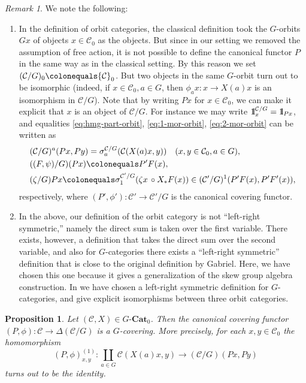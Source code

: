 \documentclass{surv-l}
\numberwithin{equation}{chapter}
\numberwithin{figure}{chapter}
\theoremstyle{plain}
\newtheorem{prp}[thm]{Proposition}
\theoremstyle{definition}
\theoremstyle{remark}
\newtheorem{rmk}[thm]{Remark}
\newcommand{\id}{1\kern-.25em{\text{{\rm l}}}}
\newcommand{\GCat}{G\text{-}\mathbf{Cat}}
\begin{document}
\begin{rmk}
We note the following:
\begin{enumerate}
\item In the definition of orbit categories,
the classical definition took the $G$-orbits $Gx$ of objects $x \in {\mathcal{C}}_0$
as the objects.  But since in our setting we removed the assumption of free action,
it is not possible to define the canonical functor $P$ in the same way as in the classical setting.
By this reason we set $({\mathcal{C}}/G)_0\colonequals  {\mathcal{C}}_0$.
But two objects in the same $G$-orbit turn out to be isomorphic
(indeed, if $x \in {\mathcal{C}}_0, a \in G$, then
$\phi_ax\colon x \to X(a)x$ is an isomorphism in ${\mathcal{C}}/G$).
Note that by writing $Px$ for $x \in {\mathcal{C}}_0$,
we can make it explicit that $x$ is an object of ${\mathcal{C}}/G$.
For instance we may write $\id_x^{{\mathcal{C}}/G} = \id_{Px}$, and
equalities \eqref{eq:hmg-part-orbit}, \eqref{eq:1-mor-orbit}, \eqref{eq:2-mor-orbit}
can be written as
\begin{align}\label{eq:hmg-part-orbit2}
&({\mathcal{C}}/G)^a(Px,Py)=\sigma^{{\mathcal{C}}/G}_a({\mathcal{C}}(X(a) x, y))\quad (x,y\in {\mathcal{C}}_0, a \in G),\\
\label{eq:1-mor-orbit2}
&((F, \psi)/G)(Px)\colonequals P'F(x),\\
\label{eq:2-mor-orbit2}
&(\zeta/G)Px \colonequals  \sigma^{{\mathcal{C}}'/G}_1(\zeta x\, \circ X_*F(x))
\in ({\mathcal{C}}'/G)^1(P'F(x), P'F'(x)),
\end{align}
respectively, where $(P', \phi') \colon {\mathcal{C}}' \to {\mathcal{C}}'/G$ is the canonical covering functor.
\item In the above, our definition of the orbit category is not ``left-right symmetric,''
namely the direct sum is taken over the first variable.
There exists, however, a definition that takes the direct sum over the second variable,
and also for $G$-categories there exists a ``left-right symmetric'' definition that is
close to the original definition by Gabriel.
Here, we have chosen this one because it gives a generalization of
the skew group algebra construction.
In \cite{Asa11} we have chosen a left-right symmetric definition for $G$-categories,
and give explicit isomorphisms between three orbit categories.
\end{enumerate}
\end{rmk}

\begin{prp}\label{prp:can-covering}
Let $({\mathcal{C}}, X) \in \GCat_0$.
Then the canonical covering functor
$(P, \phi)\colon {\mathcal{C}} \to \Delta({\mathcal{C}}/G)$ is a $G$-covering.
More precisely, for each $x, y \in {\mathcal{C}}_0$
the homomorphism
\begin{equation*}
(P, \phi)_{x,y}^{(1)}\colon \coprod_{a\in G}{\mathcal{C}}(X(a)x, y) \to ({\mathcal{C}}/G)(Px, Py)
\end{equation*}
turns out to be the identity.
\end{prp}
\end{document}
